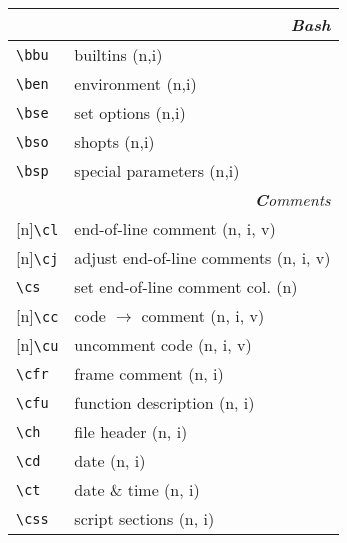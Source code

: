 \documentclass[oneside,10pt,landscape,DIV17]{scrartcl}
\newcommand{\Rep}{{\scriptsize{[n]}}}
\begin{document}
\begin{multicols}{3}
\begin{center}
\begin{tabular}[]{|p{11mm}|p{60mm}|}
\hline 
\multicolumn{2}{|r|}{\textsl{\textbf{B}ash}}\\[1.0ex]
\hline \verb'\bbu'   & builtins                             \hfill (n,i)\\
\hline \verb'\ben'   & environment                          \hfill (n,i)\\
\hline \verb'\bse'   & set options                          \hfill (n,i)\\
\hline \verb'\bso'   & shopts                               \hfill (n,i)\\
\hline \verb'\bsp'   & special parameters                   \hfill (n,i)\\
\hline 
\hline
\multicolumn{2}{|r|}{\textsl{\textbf{C}omments}}                       \\[1.0ex]
\hline \Rep\verb'\cl'   & end-of-line comment               \hfill (n, i, v)\\
\hline \Rep\verb'\cj'   & adjust end-of-line comments       \hfill (n, i, v)\\
\hline     \verb'\cs'   & set end-of-line comment col.      \hfill (n)\\
%
\hline \Rep\verb'\cc'   & code $\rightarrow$ comment        \hfill (n, i, v)\\
\hline \Rep\verb'\cu'   & uncomment code                    \hfill (n, i, v)\\
%
\hline     \verb'\cfr'  & frame comment                     \hfill (n, i)\\
\hline     \verb'\cfu'  & function description              \hfill (n, i)\\
\hline     \verb'\ch'   & file header                       \hfill (n, i)\\
\hline     \verb'\cd'   & date                              \hfill (n, i)\\
\hline     \verb'\ct'   & date \& time                      \hfill (n, i)\\
\hline     \verb'\css'  & script sections                   \hfill (n, i)\\

\end{tabular}
\end{center}
\end{multicols}
\end{document}
